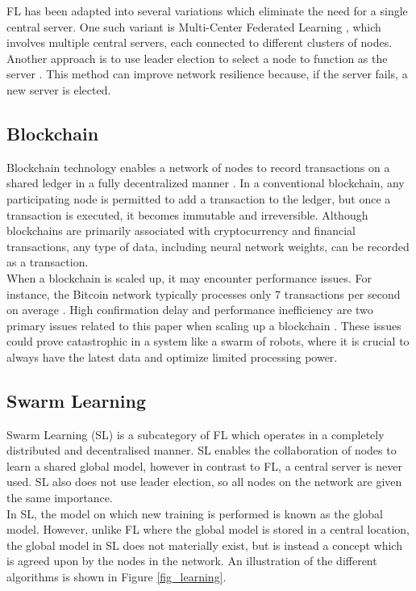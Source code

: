 \documentclass[letterpaper, 10 pt, conference]{ieeeconf}  %
\begin{document}
FL has been adapted into several variations which eliminate the need for a single central server. One such variant is Multi-Center Federated Learning \cite{multi_center_fed_learning}, which involves multiple central servers, each connected to different clusters of nodes. Another approach is to use leader election to select a node to function as the server \cite{fed_leaderelec}. This method can improve network resilience because, if the server fails, a new server is elected.

\subsection{Blockchain} \label{bg:bc}
Blockchain technology enables a network of nodes to record transactions on a shared ledger in a fully decentralized manner \cite{blockchain_review}. In a conventional blockchain, any participating node is permitted to add a transaction to the ledger, but once a transaction is executed, it becomes immutable and irreversible. Although blockchains are primarily associated with cryptocurrency and financial transactions, any type of data, including neural network weights, can be recorded as a transaction. \\

When a blockchain is scaled up, it may encounter performance issues. For instance, the Bitcoin network typically processes only 7 transactions per second on average \cite{blockchain_scale}. High confirmation delay and performance inefficiency are two primary issues related to this paper when scaling up a blockchain \cite{blockchain_scale}. These issues could prove catastrophic in a system like a swarm of robots, where it is crucial to always have the latest data and optimize limited processing power.

\subsection{Swarm Learning}
Swarm Learning (SL) is a subcategory of FL which operates in a completely distributed and decentralised manner. SL enables the collaboration of nodes to learn a shared global model, however in contrast to FL, a central server is never used. SL also does not use leader election, so all nodes on the network are given the same importance. \\

In SL, the model on which new training is performed is known as the global model. However, unlike FL where the global model is stored in a central location, the global model in SL does not materially exist, but is instead a concept which is agreed upon by the nodes in the network. An illustration of the different algorithms is shown in Figure \ref{fig_learning}. \\
\end{document}
